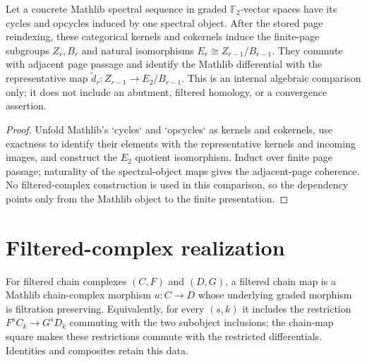 \begin{proposition}
  \label{prop:categorical-elementwise-comparison}
  \notready
  Let a concrete Mathlib spectral sequence in graded $\mathbb F_2$-vector
  spaces have its cycles and opcycles induced by one spectral object.  After
  the stored page reindexing, these categorical kernels and cokernels induce
  the finite-page subgroups $Z_r,B_r$ and natural isomorphisms
  $E_r\cong Z_{r-1}/B_{r-1}$.  They commute with adjacent page passage and
  identify the Mathlib differential with the representative map
  $\widetilde d_r:Z_{r-1}\to E_2/B_{r-1}$.  This is an internal algebraic
  comparison only; it does not include an abutment, filtered homology, or a
  convergence assertion.
\end{proposition}

\begin{proof}
  Unfold Mathlib's `cycles` and `opcycles` as kernels and cokernels, use
  exactness to identify their elements with the representative kernels and
  incoming images, and construct the $E_2$ quotient isomorphism.  Induct over
  finite page passage; naturality of the spectral-object maps gives the
  adjacent-page coherence.  No filtered-complex construction is used in this
  comparison, so the dependency points only from the Mathlib object to the
  finite presentation.
\end{proof}

\section{Filtered-complex realization}

\begin{definition}
  \label{def:filtered-chain-map}
  \leanok
  For filtered chain complexes $(C,F)$ and $(D,G)$, a filtered chain map is a
  Mathlib chain-complex morphism $u:C\to D$ whose underlying graded morphism is
  filtration preserving.  Equivalently, for every $(s,k)$ it includes the
  restriction $F^sC_k\to G^sD_k$ commuting with the two subobject inclusions;
  the chain-map square makes these restrictions commute with the restricted
  differentials.  Identities and composites retain this data.
\end{definition}

